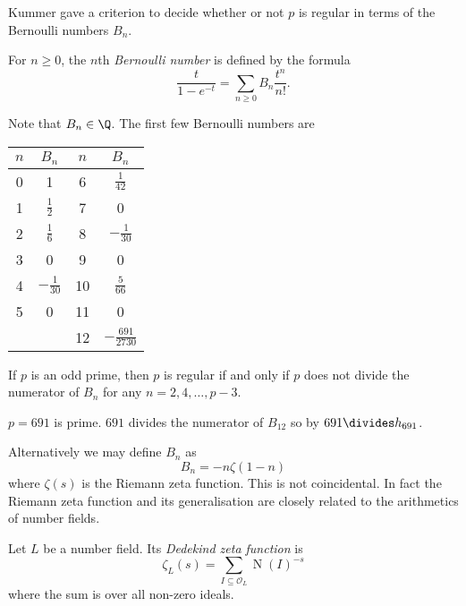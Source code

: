 \documentclass[a4paper]{article}
\renewcommand*{\O}{\mathcal{O}}
\DeclareMathOperator{\n}{N}
\begin{document}
Kummer gave a criterion to decide whether or not \(p\) is regular in terms of the Bernoulli numbers \(B_n\).

\begin{definition}
  For \(n \geq 0\), the \(n\)th \emph{Bernoulli number} is defined by the formula
  \[
    \frac{t}{1 - e^{-t}} = \sum_{n \geq 0} B_n \frac{t^n}{n!}.
  \]
\end{definition}

Note that \(B_n \in \Q\). The first few Bernoulli numbers are
\begin{table}[ht]
  \centering
  \begin{tabular}{|c|c||c|c|}
    \(n\) & \(B_n\) & \(n\) & \(B_n\) \\ \hline
    0 & 1 & 6 & \(\frac{1}{42}\) \\ \hline
    1 & \(\frac{1}{2}\) & 7 & 0 \\ \hline
    2 & \(\frac{1}{6}\) & 8 & \(-\frac{1}{30}\) \\ \hline
    3 & 0 & 9 & 0 \\ \hline
    4 & \(-\frac{1}{30}\) & 10 & \(\frac{5}{66}\) \\ \hline
    5 & 0 & 11 & 0 \\ \hline
          & & 12 & \(- \frac{691}{2730}\) \\
  \end{tabular}
\end{table}

\begin{theorem}
  \label{thm:Kummer's criterion}
  If \(p\) is an odd prime, then \(p\) is regular if and only if \(p\) does not divide the numerator of \(B_n\) for any \(n = 2, 4, \dots, p - 3\).
\end{theorem}

\begin{eg}
  \(p = 691\) is prime. \(691\) divides the numerator of \(B_{12}\) so by  \(691 \divides h_{691}\).
\end{eg}

Alternatively we may define \(B_n\) as
\[
  B_n = -n\zeta(1 - n)
\]
where \(\zeta(s)\) is the Riemann zeta function. This is not coincidental. In fact the Riemann zeta function and its generalisation are closely related to the arithmetics of number fields.

\begin{definition}
  Let \(L\) be a number field. Its \emph{Dedekind zeta function} is
  \[
    \zeta_L(s) = \sum_{I \subseteq \O_L} \n(I)^{-s}
  \]
  where the sum is over all non-zero ideals.
\end{definition}
\end{document}
